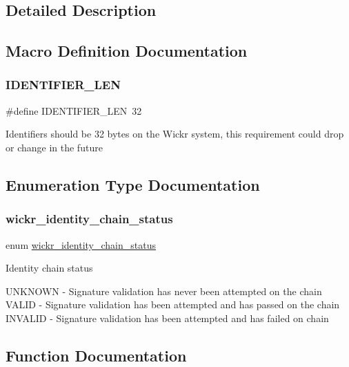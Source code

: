 \subsection{Detailed Description}


\subsection{Macro Definition Documentation}
\mbox{\label{group__wickr__identity_ga43bd60836203349a1c745d0d29bf7706}} 
\subsubsection{\texorpdfstring{IDENTIFIER\_LEN}{IDENTIFIER\_LEN}}
{\footnotesize\ttfamily \#define I\+D\+E\+N\+T\+I\+F\+I\+E\+R\+\_\+\+L\+EN~32}

Identifiers should be 32 bytes on the Wickr system, this requirement could drop or change in the future 

\subsection{Enumeration Type Documentation}
\mbox{\label{group__wickr__identity_ga78aefa3835eb13ca75c0129583b5ebfa}} 
\subsubsection{\texorpdfstring{wickr\_identity\_chain\_status}{wickr\_identity\_chain\_status}}
{\footnotesize\ttfamily enum \mbox{\hyperlink{group__wickr__identity_ga78aefa3835eb13ca75c0129583b5ebfa}{wickr\+\_\+identity\+\_\+chain\+\_\+status}}}

Identity chain status

U\+N\+K\+N\+O\+WN -\/ Signature validation has never been attempted on the chain V\+A\+L\+ID -\/ Signature validation has been attempted and has passed on the chain I\+N\+V\+A\+L\+ID -\/ Signature validation has been attempted and has failed on chain 

\subsection{Function Documentation}
\mbox{\label{group__wickr__identity_gac9d708d340abcd0b54d87434b71d2d9e}} 
